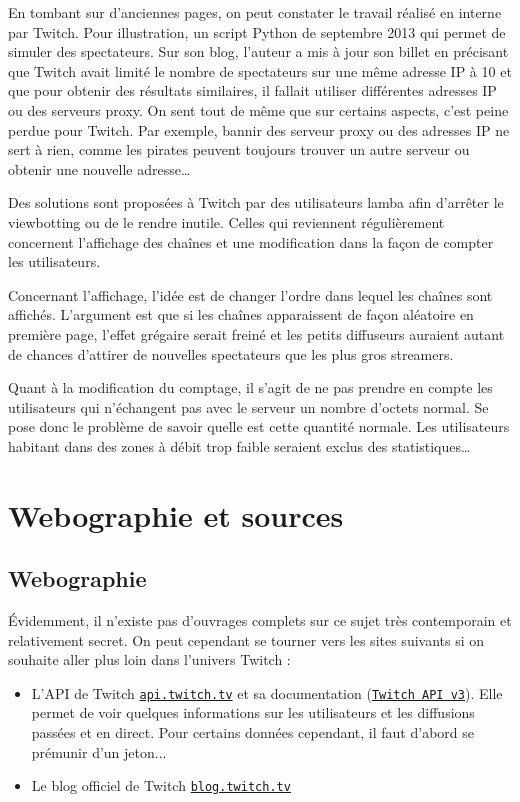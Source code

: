 \documentclass[a4paper]{article}
\begin{document}
En tombant sur d'anciennes pages, on peut constater le travail réalisé en interne par Twitch. Pour illustration, un script Python de septembre 2013 qui permet de simuler des spectateurs. Sur son blog, l'auteur a mis à jour son billet en précisant que Twitch avait limité le nombre de spectateurs sur une même adresse IP à 10 et que pour obtenir des résultats similaires, il fallait utiliser différentes adresses IP ou des serveurs proxy\cite{Zhang2013}. On sent tout de même que sur certains aspects, c'est peine perdue pour Twitch. Par exemple, bannir des serveur proxy ou des adresses IP ne sert à rien, comme les pirates peuvent toujours trouver un autre serveur ou obtenir une nouvelle adresse\ldots

Des solutions sont proposées à Twitch par des utilisateurs lamba afin d'arrêter le viewbotting ou de le rendre inutile. Celles qui reviennent régulièrement concernent l'affichage des chaînes et une modification dans la façon de compter les utilisateurs.

Concernant l'affichage, l'idée est de changer l'ordre dans lequel les chaînes sont affichés. L'argument est que si les chaînes apparaissent de façon aléatoire en première page, l'effet grégaire serait freiné et les petits diffuseurs auraient autant de chances d'attirer de nouvelles spectateurs que les plus gros streamers.

Quant à la modification du comptage, il s'agit de ne pas prendre en compte les utilisateurs qui n'échangent pas avec le serveur un nombre d'octets normal. Se pose donc le problème de savoir quelle est cette quantité normale. Les utilisateurs habitant dans des zones à débit trop faible seraient exclus des statistiques\ldots

\section{Webographie et sources}
\subsection{Webographie}
\renewcommand{\refname}{}
Évidemment, il n'existe pas d'ouvrages complets sur ce sujet très contemporain et relativement secret. On peut cependant se tourner vers les sites suivants si on souhaite aller plus loin dans l'univers Twitch :
\begin{itemize}
\item L'API de Twitch \href{https://api.twitch.tv/}{\texttt{api.twitch.tv}} et sa documentation (\href{https://github.com/justintv/twitch-api}{\texttt{Twitch API v3}}). Elle permet de voir quelques informations sur les utilisateurs et les diffusions passées et en direct. Pour certains données cependant, il faut d'abord se prémunir d'un jeton...
\item Le blog officiel de Twitch \href{https://blog.twitch.tv/}{\texttt{blog.twitch.tv}} 
\end{itemize}
\end{document}

